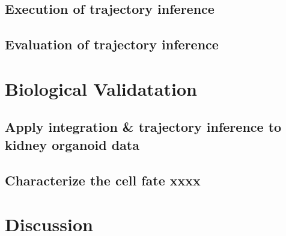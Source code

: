 \subsection{Execution of trajectory inference}


\subsection{Evaluation of trajectory inference}

\section{Biological Validatation}
\subsection{Apply integration \& trajectory inference to kidney organoid data}
\subsection{Characterize the cell fate xxxx}

\section{Discussion}

